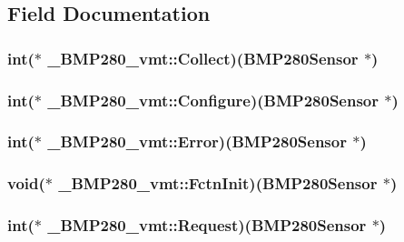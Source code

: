\subsection{Field Documentation}
\hypertarget{struct___b_m_p280__vmt_a807519b51b953f4be7be6778a53905dc}{
\subsubsection[{Collect}]{\setlength{\rightskip}{0pt plus 5cm}int($\ast$ \-\_\-\-B\-M\-P280\-\_\-vmt\-::\-Collect)({\bf B\-M\-P280\-Sensor} $\ast$)}}\label{struct___b_m_p280__vmt_a807519b51b953f4be7be6778a53905dc}
\hypertarget{struct___b_m_p280__vmt_a02c800133b0696a925cc7cab20cf385f}{
\subsubsection[{Configure}]{\setlength{\rightskip}{0pt plus 5cm}int($\ast$ \-\_\-\-B\-M\-P280\-\_\-vmt\-::\-Configure)({\bf B\-M\-P280\-Sensor} $\ast$)}}\label{struct___b_m_p280__vmt_a02c800133b0696a925cc7cab20cf385f}
\hypertarget{struct___b_m_p280__vmt_aa31c53475ba0d8d65d5c3cc56753f6f0}{
\subsubsection[{Error}]{\setlength{\rightskip}{0pt plus 5cm}int($\ast$ \-\_\-\-B\-M\-P280\-\_\-vmt\-::\-Error)({\bf B\-M\-P280\-Sensor} $\ast$)}}\label{struct___b_m_p280__vmt_aa31c53475ba0d8d65d5c3cc56753f6f0}
\hypertarget{struct___b_m_p280__vmt_a56cb4f192918dab19f6594f332cd8c51}{
\subsubsection[{Fctn\-Init}]{\setlength{\rightskip}{0pt plus 5cm}void($\ast$ \-\_\-\-B\-M\-P280\-\_\-vmt\-::\-Fctn\-Init)({\bf B\-M\-P280\-Sensor} $\ast$)}}\label{struct___b_m_p280__vmt_a56cb4f192918dab19f6594f332cd8c51}
\hypertarget{struct___b_m_p280__vmt_a92b083c30e4c2517137943ce6e787547}{
\subsubsection[{Request}]{\setlength{\rightskip}{0pt plus 5cm}int($\ast$ \-\_\-\-B\-M\-P280\-\_\-vmt\-::\-Request)({\bf B\-M\-P280\-Sensor} $\ast$)}}\label{struct___b_m_p280__vmt_a92b083c30e4c2517137943ce6e787547}


